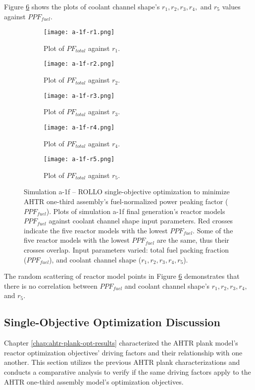 Figure \ref{fig:a-1f} shows the plots of coolant channel shape's 
$r_1, r_2, r_3, r_4,$ and $r_5$ values against $PPF_{fuel}$. 
\begin{figure}[htbp!]
    \centering
    \begin{subfigure}{0.49\textwidth}
        \texttt{[image: a-1f-r1.png]}
        \caption{Plot of $PF_{total}$ against $r_1$.}
        \label{fig:a-1f-r1} 
    \end{subfigure}
    \begin{subfigure}{0.49\textwidth}
        \texttt{[image: a-1f-r2.png]}
        \caption{Plot of $PF_{total}$ against $r_2$.}
        \label{fig:a-1f-r2} 
    \end{subfigure}
    \begin{subfigure}{0.49\textwidth}
        \texttt{[image: a-1f-r3.png]}
        \caption{Plot of $PF_{total}$ against $r_3$.}
        \label{fig:a-1f-r3} 
    \end{subfigure}
    \begin{subfigure}{0.49\textwidth}
        \texttt{[image: a-1f-r4.png]}
        \caption{Plot of $PF_{total}$ against $r_4$.}
        \label{fig:a-1f-r4} 
    \end{subfigure}
    \begin{subfigure}{0.49\textwidth}
        \texttt{[image: a-1f-r5.png]}
        \caption{Plot of $PF_{total}$ against $r_5$.}
        \label{fig:a-1f-r5} 
    \end{subfigure}
    \caption{Simulation a-1f -- ROLLO single-objective optimization to minimize 
    AHTR one-third assembly's fuel-normalized power peaking factor ($PPF_{fuel}$). 
    Plots of simulation a-1f final generation's reactor models $PPF_{fuel}$ against 
    coolant channel shape input parameters. 
    Red crosses indicate the five reactor models with the lowest $PPF_{fuel}$.
    Some of the five reactor models with the lowest $PPF_{fuel}$ are the same, thus 
    their crosses overlap.
    Input parameters varied: total fuel packing fraction 
    ($PPF_{fuel}$), and coolant channel shape ($r_1, r_2, r_3, r_4, r_5$).}
    \label{fig:a-1f}
\end{figure}
The random scattering of reactor model points in Figure \ref{fig:a-1f} demonstrates 
that there is no correlation between $PPF_{fuel}$ and coolant channel shape's 
$r_1, r_2, r_3, r_4,$ and $r_5$. 

\subsection{Single-Objective Optimization Discussion}
\label{sec:assem-discussion-single}
Chapter \ref{chap:ahtr-plank-opt-results} characterized the \gls{AHTR} plank model's 
reactor optimization objectives' driving factors and their relationship with 
one another. 
This section utilizes the previous \gls{AHTR} plank characterizations and conducts 
a comparative analysis to verify if the same driving factors apply to the 
\gls{AHTR} one-third assembly model's optimization objectives. 


